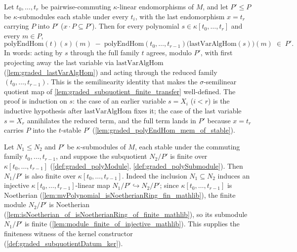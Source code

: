 \begin{lemma}

  \label{lem:graded_polyEndHom_lastVar_sub_mem}
  Let \(t_0, \dots, t_r\) be pairwise-commuting \(\kappa\)-linear endomorphisms of
  \(M\), and let \(P' \le P\) be \(\kappa\)-submodules each stable under every
  \(t_i\), with the last endomorphism \(x = t_r\) carrying \(P\) into \(P'\)
  (\(x \cdot P \subseteq P'\)). Then for every polynomial
  \(s \in \kappa[t_0, \dots, t_r]\) and every \(m \in P\),
  \[
    \mathrm{polyEndHom}(t)(s)(m)
      \;-\; \mathrm{polyEndHom}(t_0, \dots, t_{r-1})
        \bigl(\mathrm{lastVarAlgHom}(s)\bigr)(m)
      \;\in\; P' .
  \]
  In words: acting by \(s\) through the full family \(t\) agrees, modulo \(P'\), with
  first projecting away the last variable via \(\mathrm{lastVarAlgHom}\)
  (\cref{lem:graded_lastVarAlgHom}) and acting through the reduced family
  \((t_0, \dots, t_{r-1})\). This is the semilinearity identity that makes the
  \(\sigma\)-semilinear quotient map of \cref{lem:graded_subquotient_finite_transfer}
  well-defined. The proof is induction on \(s\): the case of an earlier variable
  \(s = X_i\) (\(i < r\)) is the inductive hypothesis after \(\mathrm{lastVarAlgHom}\)
  fixes it; the case of the last variable \(s = X_r\) annihilates the reduced term,
  and the full term lands in \(P'\) because \(x = t_r\) carries \(P\) into the
  \(t\)-stable \(P'\) (\cref{lem:graded_polyEndHom_mem_of_stable}).
\end{lemma}

\begin{lemma}

  \label{lem:graded_polyQuot_finite_of_le_numerator}
  Let \(N_1 \le N_2\) and \(P'\) be \(\kappa\)-submodules of \(M\), each stable under
  the commuting family \(t_0, \dots, t_{r-1}\), and suppose the subquotient
  \(N_2/P'\) is finite over \(\kappa[t_0, \dots, t_{r-1}]\)
  (\cref{def:graded_polyModule}, \cref{def:graded_polySubmodule}). Then \(N_1/P'\) is
  also finite over \(\kappa[t_0, \dots, t_{r-1}]\). Indeed the inclusion
  \(N_1 \subseteq N_2\) induces an injective \(\kappa[t_0, \dots, t_{r-1}]\)-linear
  map \(N_1/P' \hookrightarrow N_2/P'\); since
  \(\kappa[t_0, \dots, t_{r-1}]\) is Noetherian
  (\cref{lem:mvPolynomial_isNoetherianRing_fin_mathlib}), the finite module
  \(N_2/P'\) is Noetherian
  (\cref{lem:isNoetherian_of_isNoetherianRing_of_finite_mathlib}), so its submodule
  \(N_1/P'\) is finite (\cref{lem:module_finite_of_injective_mathlib}). This supplies
  the finiteness witness of the kernel constructor
  (\cref{def:graded_subquotientDatum_ker}).
\end{lemma}

